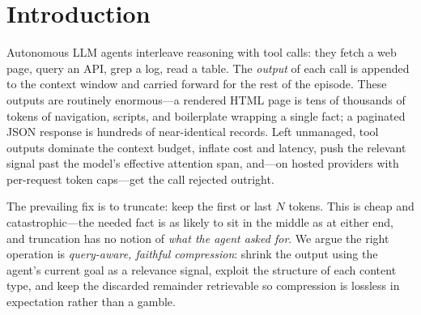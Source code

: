 \documentclass[11pt]{article}
\newcommand{\tooltrim}{\textsc{tooltrim}}
\newcommand{\tofb}{\textsc{tofb}}
\begin{document}
\begin{abstract}
complement them with a \emph{live, pre-registered} study on the
\textsc{$\tau$-bench} retail benchmark (\texttt{gpt-4o-mini} as agent and user
simulator, 40 tasks $\times$ 5 trials). Its methodological core is a
\emph{placebo-controlled difference-in-differences}: the 19 tasks on which
\tooltrim{} never fires form a byte-identical control that measures the
benchmark's own run-to-run stochasticity, which the estimator nets out. We find
\textbf{no detectable task-success harm} from compression in a real multi-step
loop (DiD $=-4.0$pp, 95\% cluster-bootstrap CI $[-23.6,+14.6]$---a CI-bounded
no-harm result, not a formal equivalence certificate), and the placebo control
reproducibly exposes a large intrinsic noise floor---two trials of the
\emph{unchanged} system disagree on 25.7\% of task pairs---which we argue makes
uncontrolled single-trial agentic A/B comparisons uninterpretable and is a
reusable instrument for evaluating any such intervention. We release \tooltrim{}
(PyPI, MIT), the \tofb{} dataset (HuggingFace), and
a reproducible baseline harness comparing \tooltrim{} against truncation, RAG
top-$k$, and LLMLingua-2.
\end{abstract}

\section{Introduction}
Autonomous LLM agents interleave reasoning with tool calls: they fetch a web
page, query an API, grep a log, read a table. The \emph{output} of each call is
appended to the context window and carried forward for the rest of the episode.
These outputs are routinely enormous---a rendered HTML page is tens of thousands
of tokens of navigation, scripts, and boilerplate wrapping a single fact; a
paginated JSON response is hundreds of near-identical records. Left unmanaged,
tool outputs dominate the context budget, inflate cost and latency, push the
relevant signal past the model's effective attention span, and---on hosted
providers with per-request token caps---get the call rejected outright.

The prevailing fix is to truncate: keep the first or last $N$ tokens. This is
cheap and catastrophic---the needed fact is as likely to sit in the middle as at
either end, and truncation has no notion of \emph{what the agent asked for}. We
argue the right operation is \emph{query-aware, faithful compression}: shrink the
output using the agent's current goal as a relevance signal, exploit the
structure of each content type, and keep the discarded remainder retrievable so
compression is lossless in expectation rather than a gamble.
\end{document}

